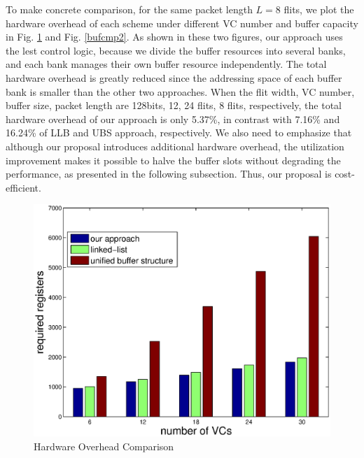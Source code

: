\documentclass[paper]{ieice}
\begin{document}
To make concrete comparison, for the same packet length $L=8$ flits, we plot the hardware overhead of each scheme under different VC number and buffer capacity in Fig. \ref{bufcmp1} and Fig. \ref{bufcmp2}. As shown in these two figures, our approach uses the lest control logic, because we divide the buffer resources into several banks, and each bank manages their own buffer resource independently. The total hardware overhead is greatly reduced since the addressing space of each buffer bank is smaller than the other two approaches. When the flit width, VC number, buffer size, packet length are 128bits, 12, 24 flits, 8 flits, respectively, the total hardware overhead of our approach is only 5.37\%, in contrast with 7.16\% and 16.24\% of LLB and UBS approach, respectively. We also need to emphasize that although our proposal introduces additional hardware overhead, the utilization improvement makes it possible to halve the buffer slots without degrading the performance, as presented in the following subsection. Thus, our proposal is cost-efficient.
\begin{figure}[h]
  \centering
  \includegraphics[scale=0.45]{figures/bufcmp1.eps}
  \caption{Hardware Overhead Comparison}\label{bufcmp1}
\end{figure}
\end{document}
